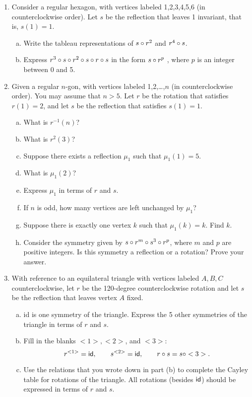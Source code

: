\begin{enumerate}

\item
Consider a regular hexagon, with vertices labeled 1,2,3,4,5,6 (in counterclockwise order). Let $s$ be the reflection that  leaves 1 invariant, that is, $s(1) = 1$.
\begin{enumerate}[(a)]
\item
Write the tableau representations of $s \circ r^2$ and $ r^4 \circ s$.
\item
Express $r^3 \circ  s \circ  r^2 \circ  s \circ  r\circ s$ in the form $s \circ r^p$ , where $p$ is an integer between 0 and 5.
\end{enumerate}

\item
Given a regular $n$-gon, with vertices labeled 1,2,…,$n$ (in counterclockwise order).  You may assume that $n>5$. Let $r$ be the rotation that satisfies $r(1)=2$, and let $s$ be the reflection that satisfies $s(1)=1$.
\begin{enumerate}[(a)]
\item
What is $r^{-1}(n)$?
\item
What is $r^2(3)$?  
\item
Suppose there exists a reflection $\mu_1$ such that $\mu_1(1)=5$. 
\item
What is  $\mu_1(2)$?
\item  
Express $\mu_1$ in terms of $r$ and $s$.
\item
If $n$ is odd, how many vertices are left unchanged by $\mu_1$?
\item 
Suppose there is exactly one vertex $k$ such that  $\mu_1(k)=k$.  Find $k$.
\item 
Consider the symmetry given by $s \circ r^m \circ s^3 \circ r^p$, where $m$ and $p$ are positive integers. Is this symmetry a reflection or a rotation?  Prove your answer. 
\end{enumerate}

\item
With reference to an equilateral triangle with vertices labeled $A,B,C$ counterclockwise, let $r$ be the 120-degree counterclockwise rotation and let $s$ be the reflection that leaves vertex $A$ fixed. 
\begin{enumerate}[(a)]
\item
{\var id} is one symmetry of the triangle. Express the 5 other symmetries of the triangle in terms of $r$ and $s$.  
\item
Fill in the blanks $<1>,  <2>$, and $<3>$: 
\[r^{<1>} = {\sf{i}d}, \qquad s^{<2>} = {\sf{i}d},\qquad  r \circ s = s \circ <3>. \]
\item
Use the relations that you wrote down in part (b) to complete the Cayley table for rotations of the triangle.  All rotations (besides ${\sf{i}d}$) should be expressed in terms of $r$ and $s$.
\end{enumerate}


\end{enumerate}

